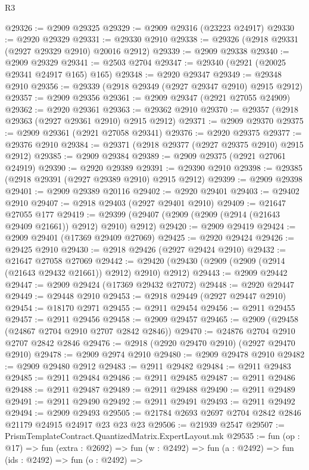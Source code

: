 \begin{lexlean}{R3}
\begin{coremodule}
@29326 := @2909 @29325
@29329 := @2909 @29316 (@23223 @24917)
@29330 := @2920 @29329
@29331 := @29330 @2910
@29338 := @29326 (@2918 @29331 (@2927 @29329 @2910) @20016 @2912)
@29339 := @2909 @29338
@29340 := @2909 @29329
@29341 := @2503 @2704
@29347 := @29340 (@2921 (@20025 @29341 @24917 @165) @165)
@29348 := @2920 @29347
@29349 := @29348 @2910
@29356 := @29339 (@2918 @29349 (@2927 @29347 @2910) @2915 @2912)
@29357 := @2909 @29356
@29361 := @2909 @29347 (@2921 @27055 @24909)
@29362 := @2920 @29361
@29363 := @29362 @2910
@29370 := @29357 (@2918 @29363 (@2927 @29361 @2910) @2915 @2912)
@29371 := @2909 @29370
@29375 := @2909 @29361 (@2921 @27058 @29341)
@29376 := @2920 @29375
@29377 := @29376 @2910
@29384 := @29371 (@2918 @29377 (@2927 @29375 @2910) @2915 @2912)
@29385 := @2909 @29384
@29389 := @2909 @29375 (@2921 @27061 @24919)
@29390 := @2920 @29389
@29391 := @29390 @2910
@29398 := @29385 (@2918 @29391 (@2927 @29389 @2910) @2915 @2912)
@29399 := @2909 @29398
@29401 := @2909 @29389 @20116
@29402 := @2920 @29401
@29403 := @29402 @2910
@29407 := @2918 @29403 (@2927 @29401 @2910)
@29409 := @21647 @27055 @177
@29419 := @29399 (@29407 (@2909 (@2909 (@2914 (@21643 @29409 @21661)) @2912) @2910) @2912)
@29420 := @2909 @29419
@29424 := @2909 @29401 (@17369 @29409 @27069)
@29425 := @2920 @29424
@29426 := @29425 @2910
@29430 := @2918 @29426 (@2927 @29424 @2910)
@29432 := @21647 @27058 @27069
@29442 := @29420 (@29430 (@2909 (@2909 (@2914 (@21643 @29432 @21661)) @2912) @2910) @2912)
@29443 := @2909 @29442
@29447 := @2909 @29424 (@17369 @29432 @27072)
@29448 := @2920 @29447
@29449 := @29448 @2910
@29453 := @2918 @29449 (@2927 @29447 @2910)
@29454 := @18170 @2971
@29455 := @2911 @29454
@29456 := @2911 @29455
@29457 := @2911 @29456
@29458 := @2909 @29457
@29465 := @2909 (@29458 (@24867 @2704 @2910 @2707 @2842 @2846))
@29470 := @24876 @2704 @2910 @2707 @2842 @2846
@29476 := @2918 (@2920 @29470 @2910) (@2927 @29470 @2910)
@29478 := @2909 @2974 @2910
@29480 := @2909 @29478 @2910
@29482 := @2909 @29480 @2912
@29483 := @2911 @29482
@29484 := @2911 @29483
@29485 := @2911 @29484
@29486 := @2911 @29485
@29487 := @2911 @29486
@29488 := @2911 @29487
@29489 := @2911 @29488
@29490 := @2911 @29489
@29491 := @2911 @29490
@29492 := @2911 @29491
@29493 := @2911 @29492
@29494 := @2909 @29493
@29505 := @21784 @2693 @2697 @2704 @2842 @2846 @21179 @24915 @24917 @23 @23 @23
@29506 := @21939 @2547
@29507 := PrismTemplateContract.QuantizedMatrix.ExpertLayout.mk
@29535 := fun (op : @17) =>
  fun (extra : @2692) =>
  fun (w : @2492) =>
  fun (a : @2492) =>
  fun (ids : @2492) =>
  fun (o : @2492) =>

\end{coremodule}
\end{lexlean}
